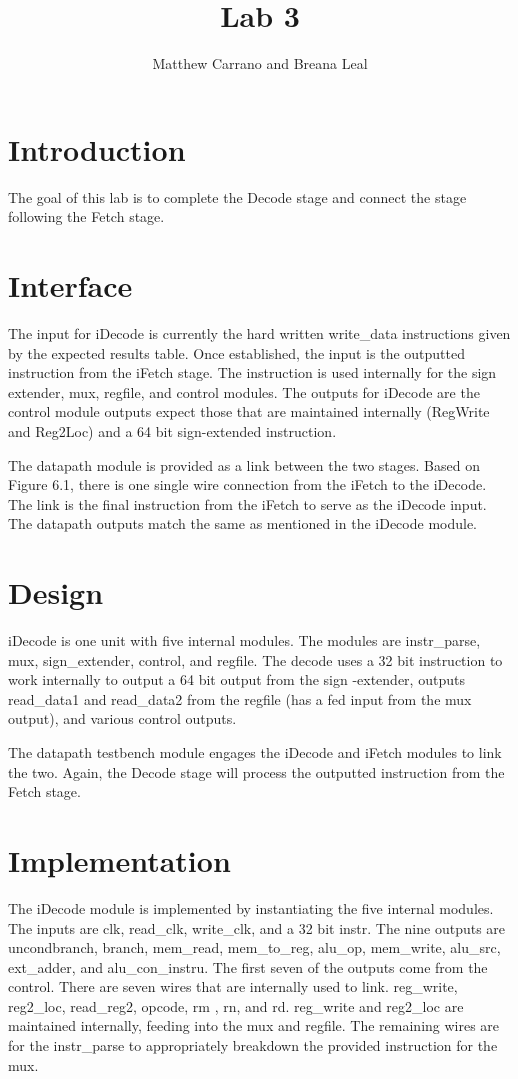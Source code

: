 \documentclass{article}
\author{Matthew Carrano and Breana Leal}
\title{Lab 3}
\begin{document}
\maketitle

\section{Introduction}
The goal of this lab is to complete the Decode stage and connect the stage following the Fetch stage.

\section{Interface}
The input for iDecode is currently the hard written write\_data instructions given by the expected results table. Once established, the input is the outputted instruction from the iFetch stage. The instruction is used internally for the sign extender, mux, regfile, and control modules. The outputs for iDecode are the control module outputs expect those that are maintained internally (RegWrite and Reg2Loc) and a 64 bit sign-extended instruction.

The datapath module is provided as a link between the two stages. Based on Figure 6.1, there is one single wire connection from the iFetch to the iDecode. The link is the final instruction from the iFetch to serve as the iDecode input. The datapath outputs match the same as mentioned in the iDecode module.

\section{Design}
iDecode is one unit with five internal modules. The modules are instr\_parse, mux, sign\_extender, control, and regfile. The decode uses a 32 bit instruction to work internally to output a 64 bit output from the sign -extender, outputs read\_data1 and read\_data2 from the regfile (has a fed input from the mux output), and various control outputs.

The datapath testbench module engages the iDecode and iFetch modules to link the two. Again, the Decode stage will process the outputted instruction from the Fetch stage.
 
\section{Implementation}
The iDecode module is implemented by instantiating the five internal modules. The inputs are clk, read\_clk, write\_clk, and a 32 bit instr. The nine outputs are uncondbranch, branch, mem\_read, mem\_to\_reg, alu\_op, mem\_write,  alu\_src, ext\_adder, and alu\_con\_instru. The first seven of the outputs come from the control. There are seven wires that are internally used to link. reg\_write, reg2\_loc, read\_reg2, opcode, rm , rn, and rd. reg\_write and reg2\_loc are maintained internally, feeding into the mux and regfile. The remaining wires are for the instr\_parse to appropriately breakdown the provided instruction for the mux.
\end{document}
